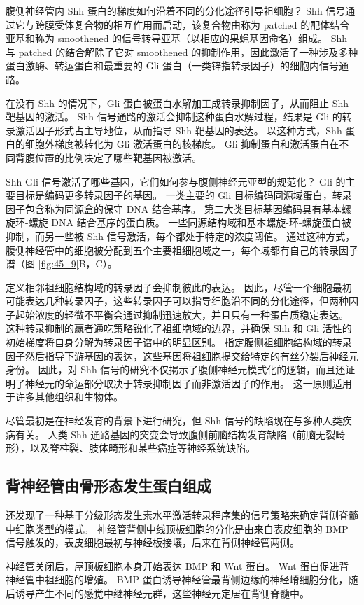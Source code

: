 腹侧神经管内 Shh 蛋白的梯度如何沿着不同的分化途径引导祖细胞？ Shh 信号通过它与跨膜受体复合物的相互作用而启动，该复合物由称为 patched 的配体结合亚基和称为 smoothened 的信号转导亚基（以相应的果蝇基因命名）组成。 Shh 与 patched 的结合解除了它对 smoothened 的抑制作用，因此激活了一种涉及多种蛋白激酶、转运蛋白和最重要的 Gli 蛋白（一类锌指转录因子）的细胞内信号通路。

在没有 Shh 的情况下，Gli 蛋白被蛋白水解加工成转录抑制因子，从而阻止 Shh 靶基因的激活。 Shh 信号通路的激活会抑制这种蛋白水解过程，结果是 Gli 的转录激活因子形式占主导地位，从而指导 Shh 靶基因的表达。 以这种方式，Shh 蛋白的细胞外梯度被转化为 Gli 激活蛋白的核梯度。 Gli 抑制蛋白和激活蛋白在不同背腹位置的比例决定了哪些靶基因被激活。

Shh-Gli 信号激活了哪些基因，它们如何参与腹侧神经元亚型的规范化？ Gli 的主要目标是编码更多转录因子的基因。 一类主要的 Gli 目标编码同源域蛋白，转录因子包含称为同源盒的保守 DNA 结合基序。 第二大类目标基因编码具有基本螺旋环-螺旋 DNA 结合基序的蛋白质。 一些同源结构域和基本螺旋-环-螺旋蛋白被抑制，而另一些被 Shh 信号激活，每个都处于特定的浓度阈值。 通过这种方式，腹侧神经管中的细胞被分配到五个主要祖细胞域之一，每个域都有自己的转录因子谱（图 \ref{fig:45_9}B，C）。

定义相邻祖细胞结构域的转录因子会抑制彼此的表达。 因此，尽管一个细胞最初可能表达几种转录因子，这些转录因子可以指导细胞沿不同的分化途径，但两种因子起始浓度的轻微不平衡会通过抑制迅速放大，并且只有一种蛋白质稳定表达。 这种转录抑制的赢者通吃策略锐化了祖细胞域的边界，并确保 Shh 和 Gli 活性的初始梯度将自身分解为转录因子谱中的明显区别。 指定腹侧祖细胞结构域的转录因子然后指导下游基因的表达，这些基因将祖细胞提交给特定的有丝分裂后神经元身份。 因此，对 Shh 信号的研究不仅揭示了腹侧神经元模式化的逻辑，而且还证明了神经元的命运部分取决于转录抑制因子而非激活因子的作用。 这一原则适用于许多其他组织和生物体。

尽管最初是在神经发育的背景下进行研究，但 Shh 信号的缺陷现在与多种人类疾病有关。 人类 Shh 通路基因的突变会导致腹侧前脑结构发育缺陷（前脑无裂畸形），以及脊柱裂、肢体畸形和某些癌症等神经系统缺陷。

\subsection{背神经管由骨形态发生蛋白组成}
还发现了一种基于分级形态发生素水平激活转录程序集的信号策略来确定背侧脊髓中细胞类型的模式。 神经管背侧中线顶板细胞的分化是由来自表皮细胞的 BMP 信号触发的，表皮细胞最初与神经板接壤，后来在背侧神经管两侧。

神经管关闭后，屋顶板细胞本身开始表达 BMP 和 Wnt 蛋白。 Wnt 蛋白促进背神经管中祖细胞的增殖。 BMP 蛋白诱导神经管最背侧边缘的神经嵴细胞分化，随后诱导产生不同的感觉中继神经元群，这些神经元定居在背侧脊髓中。

